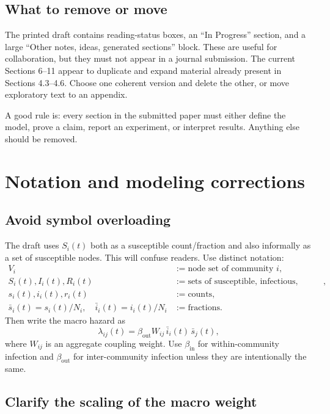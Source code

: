 \documentclass[12pt,a4paper]{article}
\theoremstyle{definition}
\newcommand{\1}{\mathbf{1}}
\begin{document}
\subsection{What to remove or move}

The printed draft contains reading-status boxes, an ``In Progress'' section, and a large ``Other notes, ideas, generated sections'' block.  These are useful for collaboration, but they must not appear in a journal submission.  The current Sections 6--11 appear to duplicate and expand material already present in Sections 4.3--4.6.  Choose one coherent version and delete the other, or move exploratory text to an appendix.

A good rule is: every section in the submitted paper must either define the model, prove a claim, report an experiment, or interpret results.  Anything else should be removed.

\section{Notation and modeling corrections}

\subsection{Avoid symbol overloading}

The draft uses $S_i(t)$ both as a susceptible count/fraction and also informally as a set of susceptible nodes.  This will confuse readers.  Use distinct notation:
\begin{align*}
    V_i &:= \text{node set of community } i,\\
    S_i(t), I_i(t), R_i(t) &:= \text{sets of susceptible, infectious, recovered nodes},\\
    s_i(t), i_i(t), r_i(t) &:= \text{counts},\\
    \bar s_i(t)=s_i(t)/N_i,\quad \bar i_i(t)=i_i(t)/N_i &:= \text{fractions}.
\end{align*}
Then write the macro hazard as
\begin{equation}
    \lambda_{ij}(t)=\beta_{\mathrm{out}} W_{ij}\,\bar i_i(t)\,\bar s_j(t),
\end{equation}
where $W_{ij}$ is an aggregate coupling weight.  Use $\beta_{\mathrm{in}}$ for within-community infection and $\beta_{\mathrm{out}}$ for inter-community infection unless they are intentionally the same.

\subsection{Clarify the scaling of the macro weight}
\end{document}
